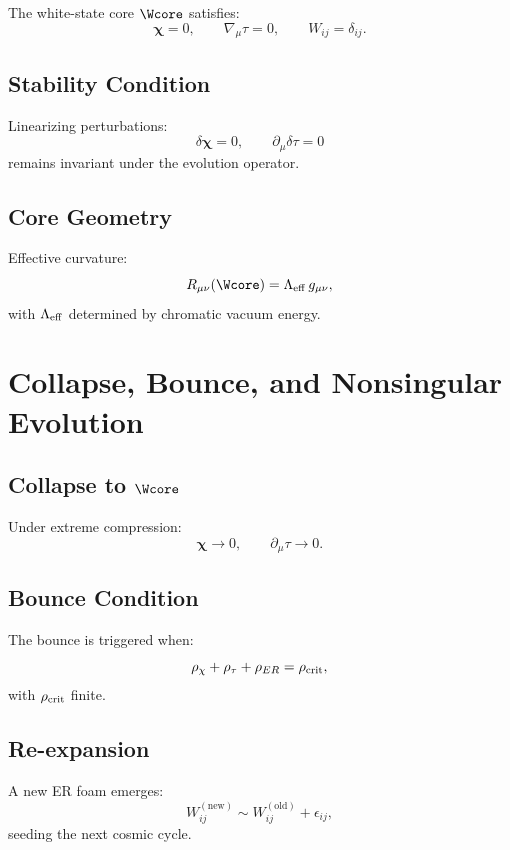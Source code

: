 The white-state core $\Wcore$ satisfies:
\[
\bm{\chi}=0,\qquad 
\nabla_\mu \tau =0,\qquad 
W_{ij}=\delta_{ij}.
\]

\section{Stability Condition}

Linearizing perturbations:
\[
\delta \bm{\chi}=0,\qquad 
\partial_\mu \delta\tau =0
\]
remains invariant under the evolution operator.

\section{Core Geometry}

Effective curvature:
\[
R_{\mu\nu}(\Wcore)
=
\Lambda_{\rm eff}\, g_{\mu\nu},
\]
with $\Lambda_{\rm eff}$ determined by chromatic vacuum energy.


\chapter{Collapse, Bounce, and Nonsingular Evolution}

\section{Collapse to $\Wcore$}

Under extreme compression:
\[
\bm{\chi}\to 0,
\qquad
\partial_\mu\tau \to 0.
\]

\section{Bounce Condition}

The bounce is triggered when:
\[
\rho_{\chi} + \rho_\tau + \rho_{ER}
=
\rho_{\rm crit},
\]
with $\rho_{\rm crit}$ finite.

\section{Re-expansion}

A new ER foam emerges:
\[
W_{ij}^{(\text{new})} \sim W_{ij}^{(\text{old})} + \epsilon_{ij},
\]
seeding the next cosmic cycle.
